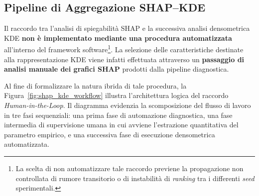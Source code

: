 \subsection{Pipeline di Aggregazione SHAP--KDE}
\label{subsec:pipeline_shap_kde}

Il raccordo tra l'analisi di spiegabilità SHAP e la successiva analisi densometrica KDE \textbf{non è implementato mediante una procedura automatizzata} all'interno del framework software\footnote{La scelta di non automatizzare tale raccordo previene la propagazione non controllata di rumore transitorio o di instabilità di \textit{ranking} tra i differenti \textit{seed} sperimentali.}. 
La selezione delle caratteristiche destinate alla rappresentazione KDE viene infatti effettuata attraverso un \textbf{passaggio di analisi manuale dei grafici SHAP} prodotti dalla pipeline diagnostica.

Al fine di formalizzare la natura ibrida di tale procedura, la Figura~\ref{fig:shap_kde_workflow} illustra l'architettura logica del raccordo \textit{Human-in-the-Loop}. Il diagramma evidenzia la scomposizione del flusso di lavoro in tre fasi sequenziali: una prima fase di automazione diagnostica, una fase intermedia di supervisione umana in cui avviene l'estrazione quantitativa del parametro empirico, e una successiva fase di esecuzione densometrica automatizzata.

